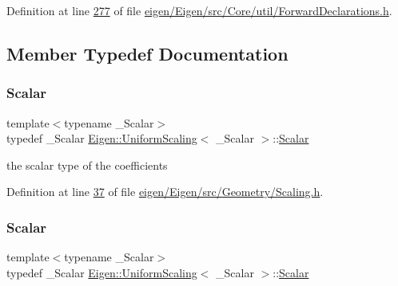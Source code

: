 Definition at line \hyperlink{eigen_2_eigen_2src_2_core_2util_2_forward_declarations_8h_source_l00277}{277} of file \hyperlink{eigen_2_eigen_2src_2_core_2util_2_forward_declarations_8h_source}{eigen/\+Eigen/src/\+Core/util/\+Forward\+Declarations.\+h}.



\subsection{Member Typedef Documentation}
\mbox{\label{class_eigen_1_1_uniform_scaling_a04c4339f58f1210c5d4d34b1bd7ae283}} 
\subsubsection{\texorpdfstring{Scalar}{Scalar}\hspace{0.1cm}{\footnotesize\ttfamily [1/2]}}
{\footnotesize\ttfamily template$<$typename \+\_\+\+Scalar$>$ \\
typedef \+\_\+\+Scalar \hyperlink{class_eigen_1_1_uniform_scaling}{Eigen\+::\+Uniform\+Scaling}$<$ \+\_\+\+Scalar $>$\+::\hyperlink{class_eigen_1_1_uniform_scaling_a04c4339f58f1210c5d4d34b1bd7ae283}{Scalar}}

the scalar type of the coefficients 

Definition at line \hyperlink{eigen_2_eigen_2src_2_geometry_2_scaling_8h_source_l00037}{37} of file \hyperlink{eigen_2_eigen_2src_2_geometry_2_scaling_8h_source}{eigen/\+Eigen/src/\+Geometry/\+Scaling.\+h}.

\mbox{\label{class_eigen_1_1_uniform_scaling_a04c4339f58f1210c5d4d34b1bd7ae283}} 
\subsubsection{\texorpdfstring{Scalar}{Scalar}\hspace{0.1cm}{\footnotesize\ttfamily [2/2]}}
{\footnotesize\ttfamily template$<$typename \+\_\+\+Scalar$>$ \\
typedef \+\_\+\+Scalar \hyperlink{class_eigen_1_1_uniform_scaling}{Eigen\+::\+Uniform\+Scaling}$<$ \+\_\+\+Scalar $>$\+::\hyperlink{class_eigen_1_1_uniform_scaling_a04c4339f58f1210c5d4d34b1bd7ae283}{Scalar}}

